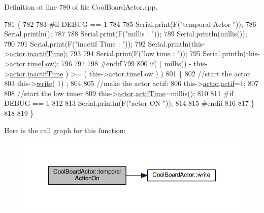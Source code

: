 Definition at line 780 of file Cool\+Board\+Actor.\+cpp.


\begin{DoxyCode}
781 \{
782 
783 \textcolor{preprocessor}{#if DEBUG == 1}
784     
785     Serial.print(F(\textcolor{stringliteral}{"temporal Actor "}));
786     Serial.println();
787 
788     Serial.print(F(\textcolor{stringliteral}{"millis : "}));
789     Serial.println(millis());
790 
791     Serial.print(F(\textcolor{stringliteral}{"inactif Time : "}));
792     Serial.println(this->\hyperlink{class_cool_board_actor_a8f190db9f7a39fddbcef7f152da970e9}{actor}.\hyperlink{struct_cool_board_actor_1_1state_a6d88835f4402b3b81cd404784281854b}{inactifTime});
793 
794     Serial.print(F(\textcolor{stringliteral}{"low time : "}));
795     Serial.println(this->\hyperlink{class_cool_board_actor_a8f190db9f7a39fddbcef7f152da970e9}{actor}.\hyperlink{struct_cool_board_actor_1_1state_a314c53c146e8c7b12c025323a34fbb9a}{timeLow});
796 
797 
798 \textcolor{preprocessor}{#endif}
799     
800      \textcolor{keywordflow}{if}( ( millis() - this->\hyperlink{class_cool_board_actor_a8f190db9f7a39fddbcef7f152da970e9}{actor}.\hyperlink{struct_cool_board_actor_1_1state_a6d88835f4402b3b81cd404784281854b}{inactifTime} ) >= (  this->actor.timeLow  ) )
801     \{
802         \textcolor{comment}{//start the actor}
803         this->\hyperlink{class_cool_board_actor_a958786ff01ea1056ee72c72d439f86da}{write}( 1) ;
804 
805         \textcolor{comment}{//make the actor actif:}
806         this->\hyperlink{class_cool_board_actor_a8f190db9f7a39fddbcef7f152da970e9}{actor}.\hyperlink{struct_cool_board_actor_1_1state_a7963178c2de01ef0d2861f9f59ad6f3c}{actif}=1;
807 
808         \textcolor{comment}{//start the low timer}
809         this->\hyperlink{class_cool_board_actor_a8f190db9f7a39fddbcef7f152da970e9}{actor}.\hyperlink{struct_cool_board_actor_1_1state_a534119a22a09b29ecb446b277d5b2ef5}{actifTime}=millis();
810 
811 \textcolor{preprocessor}{    #if DEBUG == 1 }
812 
813         Serial.println(F(\textcolor{stringliteral}{"actor ON "}));
814 
815 \textcolor{preprocessor}{    #endif              }
816 
817     \}
818 
819 \}
\end{DoxyCode}
Here is the call graph for this function\+:\nopagebreak
\begin{figure}[H]
\begin{center}
\leavevmode
\includegraphics[width=350pt]{dc/d69/class_cool_board_actor_ada603785c203fdb0b41cc967d70bdc4d_cgraph}
\end{center}
\end{figure}
